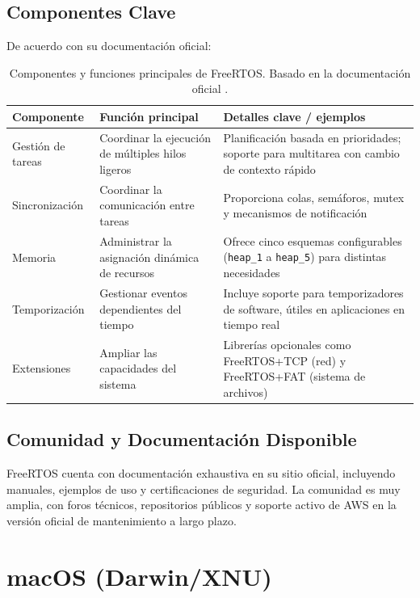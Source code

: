 \subsection{Componentes Clave}
De acuerdo con su documentación oficial:
\begin{table}[H]
\centering
\begin{tabular}{p{3.2cm}p{5cm}p{6cm}}
\hline
\textbf{Componente} & \textbf{Función principal} & \textbf{Detalles clave / ejemplos} \\
\hline
Gestión de tareas & Coordinar la ejecución de múltiples hilos ligeros & Planificación basada en prioridades; soporte para multitarea con cambio de contexto rápido \\
\hline
Sincronización & Coordinar la comunicación entre tareas & Proporciona colas, semáforos, mutex y mecanismos de notificación \\
\hline
Memoria & Administrar la asignación dinámica de recursos & Ofrece cinco esquemas configurables (\texttt{heap\_1} a \texttt{heap\_5}) para distintas necesidades \parencite{freertos_getting_started} \\
\hline
Temporización & Gestionar eventos dependientes del tiempo & Incluye soporte para temporizadores de software, útiles en aplicaciones en tiempo real \\
\hline
Extensiones & Ampliar las capacidades del sistema & Librerías opcionales como FreeRTOS+TCP (red) y FreeRTOS+FAT (sistema de archivos) \\
\hline
\end{tabular}
\caption[Componentes y funciones clave de FreeRTOS]{Componentes y funciones principales de FreeRTOS. Basado en la documentación oficial \parencite{freertos_getting_started}.}
\label{tab:componentes-freertos}
\end{table}


\subsection{Comunidad y Documentación Disponible}
FreeRTOS cuenta con documentación exhaustiva en su sitio oficial, 
incluyendo manuales, ejemplos de uso y certificaciones de seguridad.  
La comunidad es muy amplia, con foros técnicos, repositorios públicos y soporte activo 
de AWS en la versión oficial de mantenimiento a largo plazo.

\section{macOS (Darwin/XNU)}

